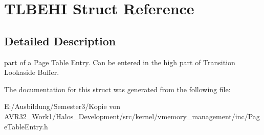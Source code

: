\hypertarget{struct_t_l_b_e_h_i}{
\section{TLBEHI Struct Reference}
\label{struct_t_l_b_e_h_i}
}


\subsection{Detailed Description}
part of a Page Table Entry. Can be entered in the high part of Transition Lookaside Buffer. 

The documentation for this struct was generated from the following file:\begin{CompactItemize}
\item 
E:/Ausbildung/Semester3/Kopie von AVR32\_\-Work1/Halos\_\-Development/src/kernel/vmemory\_\-management/inc/PageTableEntry.h\end{CompactItemize}
